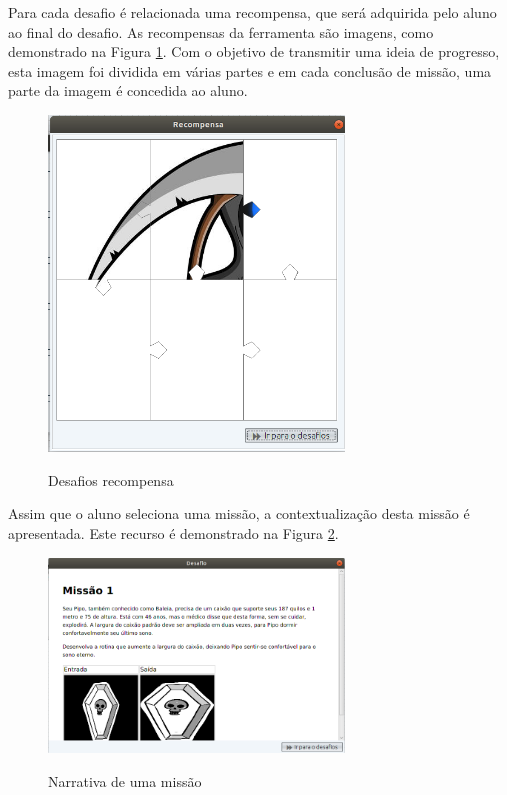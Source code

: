 \documentclass[
	12pt,				%
	oneside,			%
	a4paper,			%
	english,			%
	french,				%
	spanish,			%
	brazil,				%
	]{abntex2}
\begin{document}
Para cada desafio é relacionada uma recompensa, que será adquirida pelo aluno ao final do desafio. As recompensas da ferramenta são imagens, como demonstrado na Figura \ref{fig:visnodeDesafiosRecompensa}. Com o objetivo de transmitir uma ideia de progresso, esta imagem foi dividida em várias partes e em cada conclusão de missão, uma parte da imagem é concedida ao aluno.

\begin{figure}[H]
\centering
\caption{Desafios recompensa}
\includegraphics[width=0.7\textwidth]{imagens/visnode_desafios_recompensa.png}
\sourceAuthor
\label{fig:visnodeDesafiosRecompensa}
\end{figure}

Assim que o aluno seleciona uma missão, a contextualização desta missão é apresentada. Este recurso é demonstrado na Figura \ref{fig:visnodeMissaoNarrativa}.

\begin{figure}[H]
\centering
\caption{Narrativa de uma missão}
\includegraphics[width=0.7\textwidth]{imagens/visnode_missao_narrativa.png}
\sourceAuthor
\label{fig:visnodeMissaoNarrativa}
\end{figure}
\end{document}
